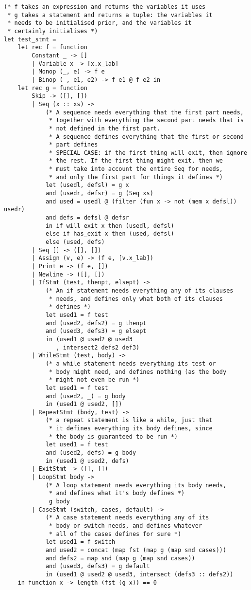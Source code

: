 \begin{lstlisting}[language=Ml]
(* f takes an expression and returns the variables it uses
 * g takes a statement and returns a tuple: the variables it
 * needs to be initialised prior, and the variables it
 * certainly initialises *)
let test_stmt = 
    let rec f = function
        Constant _ -> []
        | Variable x -> [x.x_lab]
        | Monop (_, e) -> f e
        | Binop (_, e1, e2) -> f e1 @ f e2 in
    let rec g = function
        Skip -> ([], [])
        | Seq (x :: xs) ->
            (* A sequence needs everything that the first part needs,
             * together with everything the second part needs that is
             * not defined in the first part.
             * A sequence defines everything that the first or second
             * part defines
             * SPECIAL CASE: if the first thing will exit, then ignore
             * the rest. If the first thing might exit, then we
             * must take into account the entire Seq for needs,
             * and only the first part for things it defines *)
            let (usedl, defsl) = g x
            and (usedr, defsr) = g (Seq xs)
            and used = usedl @ (filter (fun x -> not (mem x defsl)) usedr)
            and defs = defsl @ defsr
            in if will_exit x then (usedl, defsl)
            else if has_exit x then (used, defsl)
            else (used, defs)
        | Seq [] -> ([], [])
        | Assign (v, e) -> (f e, [v.x_lab])
        | Print e -> (f e, [])
        | Newline -> ([], [])
        | IfStmt (test, thenpt, elsept) ->
            (* An if statement needs everything any of its clauses
             * needs, and defines only what both of its clauses
             * defines *)
            let used1 = f test
            and (used2, defs2) = g thenpt
            and (used3, defs3) = g elsept
            in (used1 @ used2 @ used3
               , intersect2 defs2 def3)
        | WhileStmt (test, body) ->
            (* a while statement needs everything its test or
             * body might need, and defines nothing (as the body
             * might not even be run *)
            let used1 = f test
            and (used2, _) = g body
            in (used1 @ used2, [])
        | RepeatStmt (body, test) ->
            (* a repeat statement is like a while, just that
             * it defines everything its body defines, since
             * the body is guaranteed to be run *)
            let used1 = f test
            and (used2, defs) = g body
            in (used1 @ used2, defs)
        | ExitStmt -> ([], [])
        | LoopStmt body ->
            (* A loop statement needs everything its body needs,
             * and defines what it's body defines *)
             g body
        | CaseStmt (switch, cases, default) ->
            (* A case statement needs everything any of its
             * body or switch needs, and defines whatever
             * all of the cases defines for sure *)
            let used1 = f switch
            and used2 = concat (map fst (map g (map snd cases)))
            and defs2 = map snd (map g (map snd cases))
            and (used3, defs3) = g default
            in (used1 @ used2 @ used3, intersect (defs3 :: defs2))
    in function x -> length (fst (g x)) == 0

\end{lstlisting}
